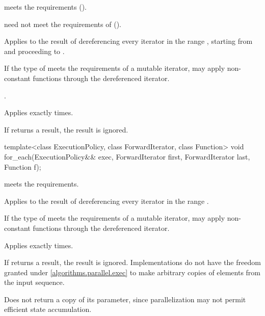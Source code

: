 \begin{itemdescr}
\pnum
\expects
{} meets
the  requirements ().
\begin{note}
 need not meet the requirements of
 ().
\end{note}

\pnum
\effects
Applies  to the result of dereferencing
every iterator in the range ,
starting from  and proceeding to .
\begin{note}
If the type of  meets the requirements of a mutable iterator,
 may apply non-constant functions through the dereferenced iterator.
\end{note}

\pnum
\returns
{}.

\pnum
\complexity
Applies  exactly  times.

\pnum
\remarks
If  returns a result, the result is ignored.
\end{itemdescr}

%
\begin{itemdecl}
template<class ExecutionPolicy, class ForwardIterator, class Function>
  void for_each(ExecutionPolicy&& exec,
                ForwardIterator first, ForwardIterator last,
                Function f);
\end{itemdecl}

\begin{itemdescr}
\pnum
\expects
{} meets the  requirements.

\pnum
\effects
Applies  to the result of dereferencing
every iterator in the range .
\begin{note}
If the type of  meets the requirements of a mutable iterator,
 may apply non-constant functions through the dereferenced iterator.
\end{note}

\pnum
\complexity
Applies  exactly  times.

\pnum
\remarks
If  returns a result, the result is ignored.
Implementations do not have
the freedom granted under \ref{algorithms.parallel.exec}
to make arbitrary copies of elements from the input sequence.

\pnum
\begin{note}
Does not return a copy of its  parameter,
since parallelization may not permit efficient state accumulation.
\end{note}
\end{itemdescr}

